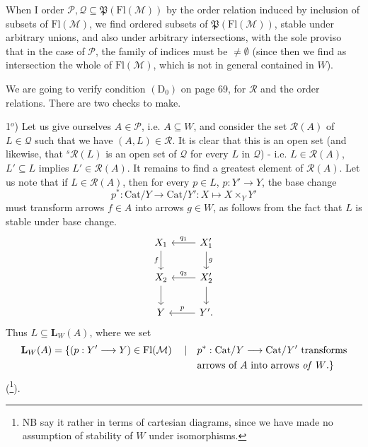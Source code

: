 \documentclass[11pt]{article}
\newcommand{\printedpage}[1]{\marginpar{\footnotesize p.~#1}}
\newcommand{\msp}[1]{\marginpar{\footnotesize [#1]}}
\newcommand{\Fl}{\mathrm{Fl}}
\newcommand{\Pf}{\mathfrak{P}}
\begin{document}
\msp{page 84}When I order $\mathcal{P},\mathcal{Q}\subseteq\Pf(\Fl(\mathcal{M}))$ by the order relation induced by inclusion of subsets of $\Fl(\mathcal{M})$, we find ordered subsets of $\Pf(\Fl(\mathcal{M}))$, stable under arbitrary unions, and also under arbitrary intersections, with the sole proviso that in the case of $\mathcal{P}$, the family of indices must be $\neq\emptyset$ (since then we find as intersection the whole of $\Fl(\mathcal{M})$, which is not in general contained in $W$). %

We are going to verify condition $(\mathrm{D}_0)$ on page 69, for $\mathcal{R}$ and the order relations. There are two checks to make.

1$^{o}$) Let us give ourselves $A\in\mathcal{P}$, i.e. $A\subseteq W$, and consider the set $\mathcal{R}(A)$ of $L\in\mathcal{Q}$ such that we have $(A,L)\in\mathcal{R}$. It is clear that this is an open set (and likewise, that ${}^{s}\mathcal{R}(L)$ is an open set of $\mathcal{Q}$ for every $L$ in $\mathcal{Q}$) - i.e. $L\in\mathcal{R}(A)$, $L'\subseteq L$ implies %
\printedpage{52}
$L'\in\mathcal{R}(A)$. It remains to find a greatest element of $\mathcal{R}(A)$. Let us note that if $L\in\mathcal{R}(A)$, then for every $p\in L$, $p : Y'\longrightarrow Y$, the base change
\[
p^{*} : \mathrm{Cat}/Y\longrightarrow\mathrm{Cat}/Y' : X\longmapsto X\times_{Y}Y'
\]
must transform arrows $f\in A$ into arrows $g\in W$, as follows from the fact that $L$ is stable under base change.
\[
\begin{tikzcd}
X_1 \arrow[d, "f"'] & X'_1 \arrow[l, "q_1"'] \arrow[d, "g"] \\
X_2 \arrow[d] & X'_2 \arrow[l, "q_2"'] \arrow[d] \\
Y & Y'. \arrow[l, "p"']
\end{tikzcd}
\]
Thus $L\subseteq\mathbf{L}_W(A)$, where we set
\msp{page 85}
\[
\begin{aligned}
\mathbf{L}_W(A)=\{(p : Y'\longrightarrow Y)\in\Fl(\mathcal{M})\quad\mid\quad & p^{*} : \mathrm{Cat}/Y\longrightarrow\mathrm{Cat}/Y'\ \text{transforms}\\
& \text{arrows of $A$ into arrows \textit{of} $W$.}\}
\end{aligned}
\]
(\footnote{NB say it rather in terms of cartesian diagrams, since we have made no assumption of stability of $W$ under isomorphisms.}).
\end{document}
